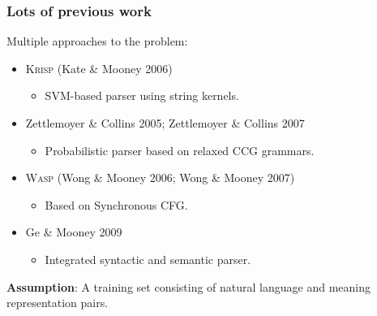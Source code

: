 \begin{frame}
  \frametitle{Lots of previous work}

  Multiple approaches to the problem:
  \begin{itemize}
  \item \textsc{Krisp} (Kate \& Mooney 2006)
    \begin{itemize}
    \item SVM-based parser using string kernels.
    \end{itemize}
  \item Zettlemoyer \& Collins 2005; Zettlemoyer \& Collins 2007
    \begin{itemize}
    \item Probabilistic parser based on relaxed CCG grammars.
    \end{itemize}
  \item \textsc{Wasp} (Wong \& Mooney 2006; Wong \& Mooney 2007)
    \begin{itemize}
    \item Based on Synchronous CFG.
    \end{itemize}
  \item Ge \& Mooney 2009
    \begin{itemize}
    \item Integrated syntactic and semantic parser.
    \end{itemize}
  \end{itemize}
  \pause
  \textbf{Assumption}: A training set consisting of natural language and meaning
  representation pairs.
\end{frame}


